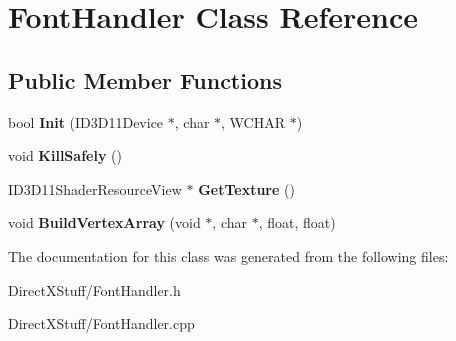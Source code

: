 \hypertarget{class_font_handler}{\section{Font\-Handler Class Reference}
\label{class_font_handler}
}
\subsection*{Public Member Functions}
\begin{DoxyCompactItemize}
\item 
\hypertarget{class_font_handler_a60930ca40ba6bd0fc77aa10ca6159b33}{bool {\bfseries Init} (I\-D3\-D11\-Device $\ast$, char $\ast$, W\-C\-H\-A\-R $\ast$)}\label{class_font_handler_a60930ca40ba6bd0fc77aa10ca6159b33}

\item 
\hypertarget{class_font_handler_a1bbc2cfe6cf8b92c1451aacdcbb6d130}{void {\bfseries Kill\-Safely} ()}\label{class_font_handler_a1bbc2cfe6cf8b92c1451aacdcbb6d130}

\item 
\hypertarget{class_font_handler_a2b25b6062c606e687aa4811d067ffbbd}{I\-D3\-D11\-Shader\-Resource\-View $\ast$ {\bfseries Get\-Texture} ()}\label{class_font_handler_a2b25b6062c606e687aa4811d067ffbbd}

\item 
\hypertarget{class_font_handler_a90d7e517ef955131bf2a4a3b251f3c35}{void {\bfseries Build\-Vertex\-Array} (void $\ast$, char $\ast$, float, float)}\label{class_font_handler_a90d7e517ef955131bf2a4a3b251f3c35}

\end{DoxyCompactItemize}


The documentation for this class was generated from the following files\-:\begin{DoxyCompactItemize}
\item 
Direct\-X\-Stuff/Font\-Handler.\-h\item 
Direct\-X\-Stuff/Font\-Handler.\-cpp\end{DoxyCompactItemize}
